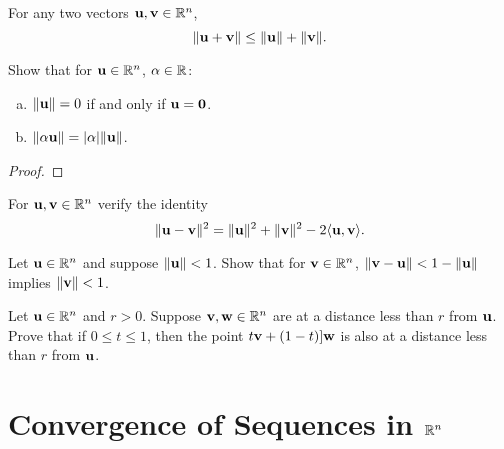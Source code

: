 \documentclass[letterpaper, twoside, 12pt]{book}
\begin{document}
\begin{theorem}
  For any two vectors \(\mathbf u,\mathbf v\in\mathbb R^n\),
  \[
    \|\mathbf u+\mathbf v\|
      \leq
    \|\mathbf u\|+\|\mathbf v\|
  .\]
\end{theorem}

\begin{exercise}[3]
  Show that for \(\mathbf u\in\mathbb R^n\), \(\alpha\in\mathbb R\):
  \begin{enumerate}[(a)]
    \item \(\|\mathbf u\|=0\) if and only if \(\mathbf u=\mathbf 0\).
    \item \(\|\alpha\mathbf u\|=|\alpha|\|\mathbf u\|\).
  \end{enumerate}
\end{exercise}
\begin{proof}

\end{proof}

\begin{exercise}[4]
  For \(\mathbf u,\mathbf v\in\mathbb R^n\) verify the identity
  \[
    \|\mathbf u-\mathbf v\|^2
      =
    \|\mathbf u\|^2+\|\mathbf v\|^2-2\langle\mathbf u,\mathbf v\rangle
  .\]
\end{exercise}
\begin{solution}

\end{solution}

\begin{exercise}[9]
  Let \(\mathbf u\in\mathbb R^n\) and suppose \(\|\mathbf u\|<1\).
  Show that for \(\mathbf v\in\mathbb R^n\),
  \(\|\mathbf v-\mathbf u\|<1-\|\mathbf u\|\) implies
  \(\|\mathbf v\|<1\).
\end{exercise}
\begin{solution}

\end{solution}

\begin{exercise}[10]
  Let \(\mathbf u\in\mathbb R^n\) and \(r>0\). Suppose \(\mathbf v,\mathbf w\in\mathbb R^n\)
  are at a distance less than \(r\) from \(\mathbf u\). Prove that if
  \(0\leq t\leq 1\), then the point \(t\mathbf v+(1-t)]\mathbf w\) is also
  at a distance less than \(r\) from \(\mathbf u\).
\end{exercise}
\begin{solution}

\end{solution}


\section{Convergence of Sequences in \texorpdfstring{$\mathbb R^n$}{Rn}}
\end{document}
